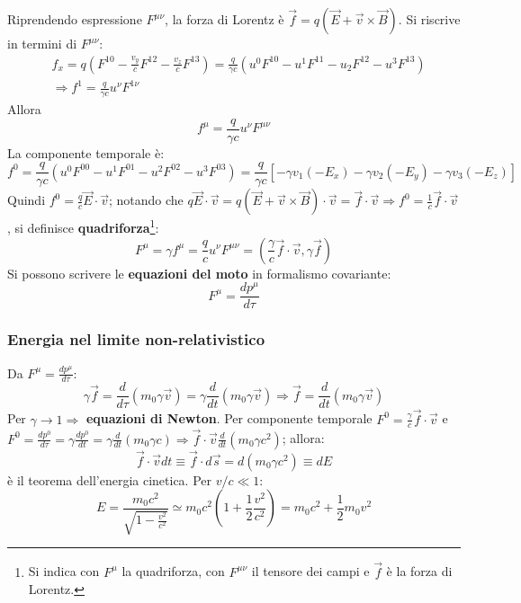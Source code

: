 \documentclass[10pt, a4paper]{scrartcl}
\numberwithin{equation}{subsection}
\theoremstyle{style1}
\begin{document}
Riprendendo espressione $F^{\mu \nu} $, la forza di Lorentz \`e $\vec{f}= q (\vec{E}+ \vec{v}\times \vec{B})$. Si riscrive in termini di $F^{\mu \nu} $:
\[
	\begin{split}
		&f_x = q \left(F^{1 0} - \frac{v_y}{c}F^{12} - \frac{v_z}{c}F^{13}\right)  = \frac{q}{\gamma c} (u^0 F^{10} - u^1 F^{11}  - u_2 F^{12} - u^3 F^{13} ) \\
		&\Rightarrow f^1 = \frac{q}{\gamma c}u^\nu F^{1 \nu} 
	\end{split}
\] 
Allora
\begin{equation}
	f^\mu  = \frac{q}{\gamma c} u^\nu F^{\mu  \nu} 
\end{equation}
La componente temporale \`e:
\[
f^0 = \frac{q}{\gamma c } \left(u^0 F^{00} - u^1 F^{01} - u^2 F^{02} - u^3F^{03}    \right) = \frac{q}{\gamma c}\left[ - \gamma v_1 ( -E_x) - \gamma v_2(-E_y) - \gamma v_3 ( -E_z) \right]
\] 
Quindi $f^0 =\frac{q}{c} \vec{E}\cdot \vec{v}$; notando che $q \vec{E}\cdot \vec{v}= q(\vec{E}+ \vec{v}\times \vec{B}) \cdot \vec{v}= \vec{f}\cdot \vec{v}\Rightarrow f^0 = \frac{1}{c}\vec{f}\cdot \vec{v}$, si definisce \textbf{quadriforza}\footnote{Si indica con $F^\mu $ la quadriforza, con $F^{\mu  \nu} $ il tensore dei campi e $\vec{f}$ \`e la forza di Lorentz.}:
\begin{equation}
	F^\mu  = \gamma f^\mu  = \frac{q}{c}u^\nu F^{\mu  \nu} = \left(\frac{\gamma}{c} \vec{f}\cdot \vec{v}, \gamma\vec{f}\right)  
\end{equation}
Si possono scrivere le \textbf{equazioni del moto} in formalismo covariante:
\begin{equation}
	F^\mu  = \frac{d p^\mu }{d \tau } 
\end{equation}
\subsubsection{Energia nel limite non-relativistico}
Da $F^\mu  =  \frac{d p^\mu }{d \tau } $:
\[
\gamma\vec{f}= \frac{d }{d \tau } (m_0\gamma\vec{v}) = \gamma \frac{d }{d t} (m_0\gamma\vec{v})\Rightarrow \vec{f}=\frac{d }{d t} (m_0\gamma\vec{v})
\] 
Per $\gamma\to 1 \Rightarrow $ \textbf{equazioni di Newton}. Per componente temporale $F^0 = \frac{\gamma}{c}\vec{f}\cdot \vec{v}$ e $F^0= \frac{d p^0}{d \tau } = \gamma\frac{d p^0}{d t} = \gamma\frac{d }{d t} (m_0\gamma c) \Rightarrow \vec{f}\cdot \vec{v} \frac{d }{d t} (m_0\gamma c^2)$; allora:
\begin{equation}
	\vec{f}\cdot \vec{v} dt \equiv \vec{f}\cdot d\vec{s} = d(m_0\gamma c^2) \equiv dE
\end{equation}
\`e il teorema dell'energia cinetica. Per $v / c \ll 1$:
\begin{equation}
	E = \frac{m_0 c^2}{\sqrt{1- \frac{v^2}{c^2}} }\simeq m_0c^2 \left(1 + \frac{1}{2}\frac{v^2 }{c^2}\right)   = m_0c^2 + \frac{1}{2}m_0v^2
\end{equation}
\end{document}
